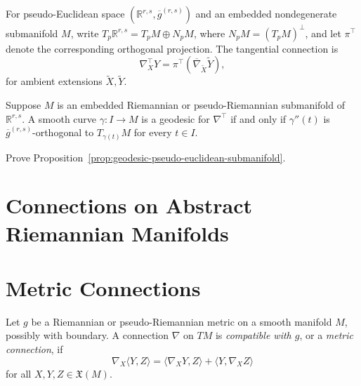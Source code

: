 For pseudo-Euclidean space $(\mathbb R^{r,s},\overline g^{(r,s)})$ and an
embedded nondegenerate submanifold $M$, write
$T_p\mathbb R^{r,s}=T_pM\oplus N_pM$, where
$N_pM=(T_pM)^\perp$, and let $\pi^\top$ denote the corresponding orthogonal
projection. The tangential connection is
\[
\nabla_X^\top Y=\pi^\top(\overline\nabla_{\widetilde X}\widetilde Y),
\]
for ambient extensions $\widetilde X,\widetilde Y$.

\begin{proposition}
\label{prop:geodesic-pseudo-euclidean-submanifold}

Suppose $M$ is an embedded Riemannian or pseudo-Riemannian submanifold of
$\mathbb R^{r,s}$. A smooth curve $\gamma:I\to M$ is a geodesic for
$\nabla^\top$ if and only if $\gamma''(t)$ is
$\overline g^{(r,s)}$-orthogonal to $T_{\gamma(t)}M$ for every $t\in I$.
\end{proposition}

\begin{exercise}
\label{exer:prove-geodesic-pseudo-euclidean-submanifold}

Prove Proposition~\ref{prop:geodesic-pseudo-euclidean-submanifold}.
\end{exercise}

\section{Connections on Abstract Riemannian Manifolds}

\section{Metric Connections}

Let $g$ be a Riemannian or pseudo-Riemannian metric on a smooth manifold $M$,
possibly with boundary. A connection $\nabla$ on $TM$ is \emph{compatible
with $g$}, or a \emph{metric connection}, if
\begin{equation}
\nabla_X\langle Y,Z\rangle
=\langle\nabla_XY,Z\rangle+\langle Y,\nabla_XZ\rangle
\tag{5.1}
\end{equation}
for all $X,Y,Z\in\mathfrak X(M)$.

